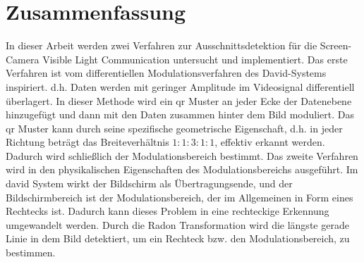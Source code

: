 \chapter{Zusammenfassung} \label{cha:Zusammenfassung}

In dieser Arbeit werden zwei Verfahren zur Ausschnittsdetektion für die Screen-Camera Visible Light Communication untersucht und implementiert. Das erste Verfahren ist vom differentiellen Modulationsverfahren des David-Systems inspiriert. d.h. Daten werden mit geringer Amplitude im Videosignal differentiell überlagert. In dieser Methode wird ein \gls{qr} Muster an jeder Ecke der Datenebene hinzugefügt und dann mit den Daten zusammen hinter dem Bild moduliert. Das \gls{qr} Muster kann durch seine spezifische geometrische Eigenschaft, d.h. in jeder Richtung beträgt das Breiteverhältnis $1:1:3:1:1$, effektiv erkannt werden. Dadurch wird schließlich der Modulationsbereich bestimmt. Das zweite Verfahren wird in den physikalischen Eigenschaften des Modulationsbereichs ausgeführt. Im \gls{david} System wirkt der Bildschirm als Übertragungsende, und der Bildschirmbereich ist der Modulationsbereich, der im Allgemeinen in Form eines Rechtecks ist. Dadurch kann dieses Problem in eine rechteckige Erkennung umgewandelt werden. Durch die Radon Transformation wird die längste gerade Linie in dem Bild detektiert, um ein Rechteck bzw. den Modulationsbereich, zu bestimmen.

